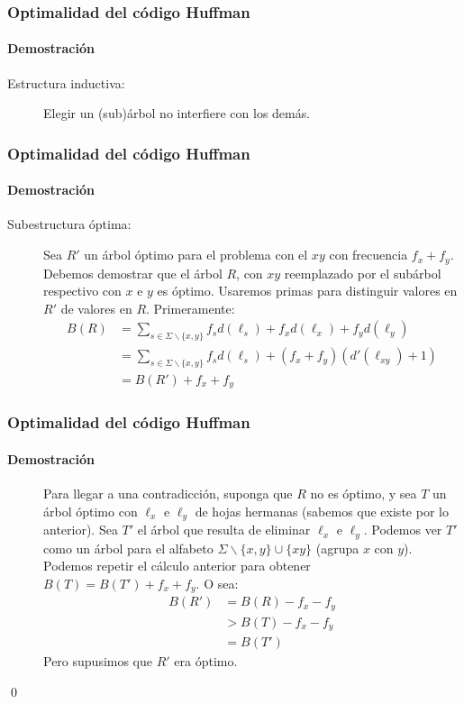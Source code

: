 \documentclass[english, spanish, fleqn,%
hyperref = {colorlinks, urlcolor = blue}%
]{beamer}
\begin{document}
\begin{frame}
  \setcounter{beamerpauses}{2}
  \frametitle{Optimalidad del código Huffman}
  \framesubtitle{Demostración}

  \begin{description}
    \item[Estructura inductiva:]
      Elegir un (sub)árbol no interfiere con los demás.
  \end{description}
\end{frame}

\begin{frame}
  \setcounter{beamerpauses}{2}
  \frametitle{Optimalidad del código Huffman}
  \framesubtitle{Demostración}

  \begin{description}
    \item[Subestructura óptima:]
      Sea \(R'\) un árbol óptimo para el problema con el 
      \(x y\) con frecuencia \(f_x + f_y\).
      Debemos demostrar que el árbol \(R\),
      con \(x y\) reemplazado por el subárbol respectivo con \(x\) e \(y\)
      es óptimo.
      Usaremos primas para distinguir valores en \(R'\) de valores en \(R\).
      Primeramente:
      \begin{align*}
        B(R)
          &= \sum_{s \in \Sigma \smallsetminus \{ x, y \}} f_s d(\ell_s)
               + f_x d(\ell_x) + f_y d(\ell_y) \\
          &= \sum_{s \in \Sigma \smallsetminus \{ x, y \}} f_s d(\ell_s)
               + (f_x + f_y) (d'(\ell_{x y}) + 1) \\
          &= B(R') + f_x + f_y
      \end{align*}
  \end{description}
\end{frame}

\begin{frame}
  \setcounter{beamerpauses}{2}
  \frametitle{Optimalidad del código Huffman}
  \framesubtitle{Demostración}

  \begin{description}
  \item[]
    Para llegar a una contradicción,
    suponga que \(R\) no es óptimo,
    y sea \(T\) un árbol óptimo con \(\ell_x\) e \(\ell_y\) de hojas hermanas
    (sabemos que existe por lo anterior).
    Sea \(T'\) el árbol que resulta de eliminar \(\ell_x\) e \(\ell_y\).
    Podemos ver \(T'\) como un árbol
    para el alfabeto \(\Sigma \smallsetminus \{ x, y \} \cup \{ x y \}\)
    (agrupa \(x\) con \(y\)).
    Podemos repetir el cálculo anterior para obtener
    \(B(T) = B(T') + f_x + f_y\).
    O sea:
    \begin{align*}
      B(R')
        &= B(R) - f_x - f_y \\
        &> B(T) - f_x - f_y \\
        &= B(T')
    \end{align*}
    Pero supusimos que \(R'\) era óptimo.
  \end{description}
  \qed
\end{frame}
\end{document}
